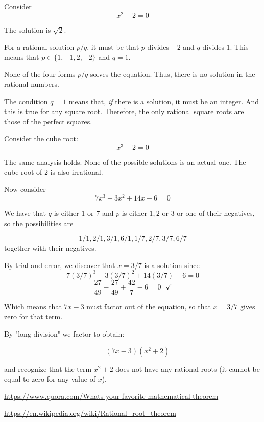 \documentclass[11pt, oneside]{article}
\begin{document}
Consider
\[ x^2 - 2 = 0 \]

The solution is $\sqrt{2}$.  

For a rational solution $p/q$, it must be that $p$ divides $-2$ and $q$ divides $1$.   This means that $p \in \{ 1,-1,2,-2 \}$ and $q = 1$.

None of the four forms $p/q$ solves the equation.  Thus, there is no solution in the rational numbers.

The condition $q= 1$ means that, \emph{if} there is a solution, it must be an integer.  And this is true for any square root.  Therefore, the only rational square roots are those of the perfect squares.

Consider the cube root:
\[ x^3 - 2 = 0 \]

The same analysis holds.  None of the possible solutions is an actual one.  The cube root of $2$ is also irrational.

Now consider
\[ 7x^3 - 3x^2 + 14x - 6 = 0 \]

We have that $q$ is either $1$ or $7$ and $p$ is either $1,2$ or $3$  or one of their negatives, so the possibilities are

\[ 1/1, 2/1, 3/1, 6/1, 1/7, 2/7, 3/7, 6/7 \]
together with their negatives.  

By trial and error, we discover that $x = 3/7$ is a solution since
\[ 7 (3/7)^3 - 3(3/7)^2 + 14(3/7) - 6 = 0 \]
\[ \frac{27}{49} - \frac{27}{49} + \frac{42}{7} - 6 = 0 \ \ \ \checkmark \]

Which means that $7x - 3$ must factor out of the equation, so that $x = 3/7$ gives zero for that term.  

By "long division" we factor to obtain:

\[ = (7x - 3)(x^2 + 2) \]

and recognize that the term $x^2 + 2$ does not have any rational roots (it cannot be equal to zero for any value of $x$).

\url{https://www.quora.com/Whats-your-favorite-mathematical-theorem}

\url{https://en.wikipedia.org/wiki/Rational_root_theorem}
\end{document}
